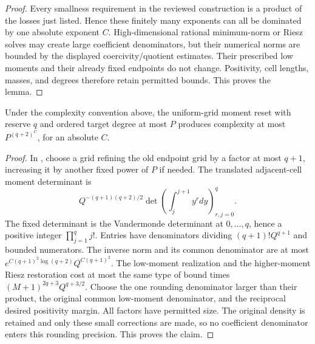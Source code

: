 \documentclass[11pt]{article}
\begin{document}
\begin{proof}
Every smallness requirement in the reviewed construction is a product
of the losses just listed. Hence these finitely many exponents can
all be dominated by one absolute exponent $C$.
High-dimensional rational minimum-norm or Riesz solves may create
large coefficient denominators, but their numerical norms are bounded
by the displayed coercivity/quotient estimates. Their prescribed low
moments and their already fixed endpoints do not change. Positivity,
cell lengths, masses, and degrees therefore retain permitted bounds.
This proves the lemma.
\end{proof}

\begin{lemma}\label{reset}
Under the complexity convention above, the uniform-grid moment reset
with reserve $q$ and ordered target degree at most $P$ produces
complexity at most $P^{(q+2)^C}$, for an absolute $C$.
\end{lemma}
\begin{proof}
In , choose a grid refining
the old endpoint grid by a factor at most $q+1$, increasing it by
another fixed power of $P$ if needed. The translated adjacent-cell
moment determinant is
\[
 Q^{-(q+1)(q+2)/2}
       \det\left(\int_j^{j+1}y^rdy\right)_{r,j=0}^q.
\]
The fixed determinant is the Vandermonde determinant at
$0,\ldots,q$, hence a positive integer $\prod_{j=1}^q j!$.
Entries have denominators dividing $(q+1)!Q^{q+1}$ and bounded
numerators. The inverse norm and its common denominator are at most
$e^{C(q+1)^2\log(q+2)}Q^{C(q+1)^2}$.
The low-moment realization and the higher-moment Riesz restoration
cost at most the same type of bound times
$(M+1)^{2q+3}Q^{q+3/2}$.
Choose the one rounding denominator larger than their product, the
original common low-moment denominator, and the reciprocal desired
positivity margin. All factors have permitted size. The original
density is retained and only these small corrections are made, so no
coefficient denominator enters this rounding precision. This proves
the claim.
\end{proof}
\end{document}
